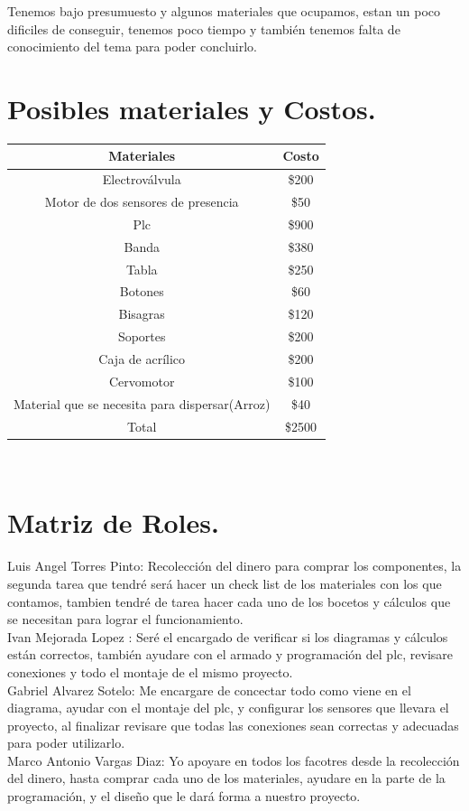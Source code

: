 \documentclass[10pt,a4paper]{article}
\begin{document}
Tenemos bajo presumuesto y algunos materiales que ocupamos, estan un poco dificiles de conseguir, tenemos poco tiempo y también tenemos falta de conocimiento del tema para poder concluirlo.
\\
\section{Posibles materiales y Costos.}
\centering
\begin{tabular}{|c|c|}\hline
Materiales & Costo \\\hline
Electroválvula & \$200 \\ \hline
Motor de dos sensores de presencia & \$50 \\ \hline
Plc & \$900 \\ \hline
Banda & \$380 \\ \hline
Tabla & \$250 \\ \hline
Botones & \$60 \\ \hline
Bisagras & \$120 \\ \hline
Soportes & \$200 \\ \hline
Caja de acrílico & \$200 \\ \hline
Cervomotor & \$100 \\ \hline
Material que se necesita para dispersar(Arroz) & \$40 \\ \hline
Total & \$2500 \\ \hline

\end{tabular}\\
\raggedright
\section{Matriz de Roles.}
Luis Angel Torres Pinto: Recolección del dinero para comprar los componentes, la segunda tarea que tendré será hacer un check list de los materiales con los que contamos, tambien tendré de tarea hacer cada uno de los bocetos y cálculos que se necesitan para lograr el funcionamiento.\\
Ivan Mejorada Lopez : Seré el encargado de verificar si los diagramas y cálculos están correctos, también ayudare con el armado y programación del plc, revisare conexiones y todo el montaje de el mismo proyecto.\\
Gabriel Alvarez Sotelo: Me encargare de concectar todo como viene en el diagrama, ayudar con el montaje del plc, y configurar los sensores que llevara el proyecto, al finalizar revisare que todas las conexiones sean correctas y adecuadas para poder utilizarlo. \\
Marco Antonio Vargas Diaz: Yo apoyare en todos los facotres desde la recolección del dinero, hasta comprar cada uno de los materiales, ayudare en la parte de la programación, y el diseño que le dará forma a nuestro proyecto.
\\
\end{document}
